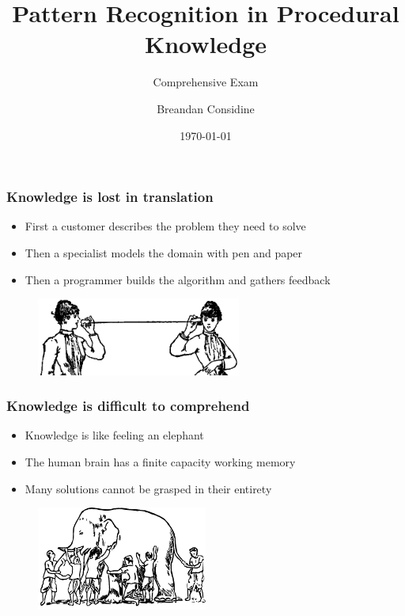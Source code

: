 \documentclass{beamer}
\title{Pattern Recognition in Procedural Knowledge}
\subtitle{Comprehensive Exam}
\author{Breandan Considine}
\institute[McGill]{
McGill University \\
\medskip
\textit{breandan.considine@mcgill.ca}
}
\date{\today}
\begin{document}
    \begin{frame}
        \titlepage
    \end{frame}

    \begin{frame}
    \frametitle{Knowledge is lost in translation}
        \begin{itemize}
            \item First a customer describes the problem they need to solve
            \item Then a specialist models the domain with pen and paper
            \item Then a programmer builds the algorithm and gathers feedback
        \end{itemize}
        \begin{figure}[H]
            \centering
            \includegraphics[width=0.6\textwidth]{../clipart/tincan.jpg}
        \end{figure}
    \end{frame}

    \begin{frame}
        \frametitle{Knowledge is difficult to comprehend}
        \begin{itemize}
        \item Knowledge is like feeling an elephant
        \item The human brain has a finite capacity working memory
        \item Many solutions cannot be grasped in their entirety
        \end{itemize}
        \begin{figure}[H]
            \centering
            \includegraphics[width=0.5\textwidth]{../clipart/elephant.png}
        \end{figure}
    \end{frame}
\end{document}
